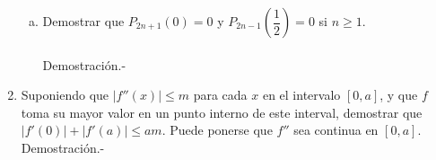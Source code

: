 \begin{enumerate}[\bfseries 1.]
\begin{enumerate}[a)]
	    \item Demostrar que $P_{2n+1}(0)=0$ y $P_{2n-1}\left(\dfrac{1}{2}\right)=0$ si $n\geq 1.$\\\\
		Demostración.-\;

	\end{enumerate}

    \item Suponiendo que $|f''(x)|\leq m$ para cada $x$ en el intervalo $[0,a]$, y que $f$ toma su mayor valor en un punto interno de este interval, demostrar que $|f'(0)|+|f'(a)|\leq am$. Puede ponerse que $f''$ sea continua en $[0,a]$.
	Demostración.-\; 

\end{enumerate}

